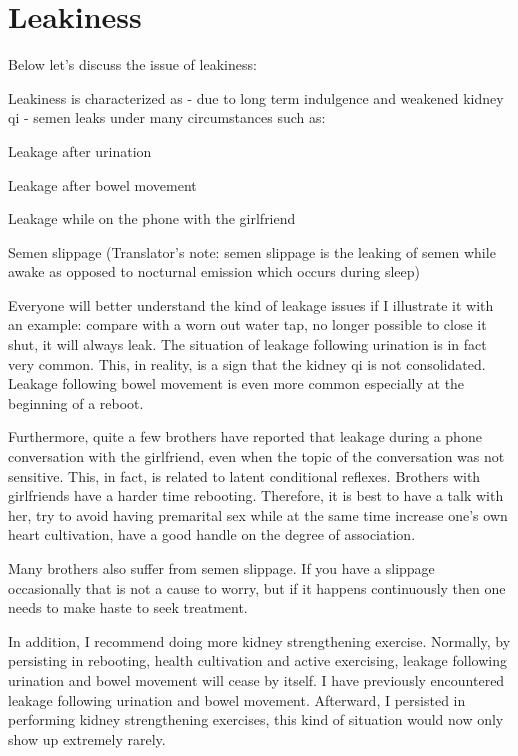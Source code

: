 \documentclass[
]{book}
\begin{document}
\hypertarget{leakiness}{%
\section{Leakiness}\label{leakiness}}

Below let's discuss the issue of leakiness:

Leakiness is characterized as - due to long term indulgence and weakened kidney qi - semen leaks under many circumstances such as:

Leakage after urination

Leakage after bowel movement

Leakage while on the phone with the girlfriend

Semen slippage (Translator's note: semen slippage is the leaking of semen while awake as opposed to nocturnal emission which occurs during sleep)

Everyone will better understand the kind of leakage issues if I illustrate it with an example: compare with a worn out water tap, no longer possible to close it shut, it will always leak. The situation of leakage following urination is in fact very common. This, in reality, is a sign that the kidney qi is not consolidated. Leakage following bowel movement is even more common especially at the beginning of a reboot.

Furthermore, quite a few brothers have reported that leakage during a phone conversation with the girlfriend, even when the topic of the conversation was not sensitive. This, in fact, is related to latent conditional reflexes. Brothers with girlfriends have a harder time rebooting. Therefore, it is best to have a talk with her, try to avoid having premarital sex while at the same time increase one's own heart cultivation, have a good handle on the degree of association.

Many brothers also suffer from semen slippage. If you have a slippage occasionally that is not a cause to worry, but if it happens continuously then one needs to make haste to seek treatment.

In addition, I recommend doing more kidney strengthening exercise. Normally, by persisting in rebooting, health cultivation and active exercising, leakage following urination and bowel movement will cease by itself. I have previously encountered leakage following urination and bowel movement. Afterward, I persisted in performing kidney strengthening exercises, this kind of situation would now only show up extremely rarely.
\end{document}
